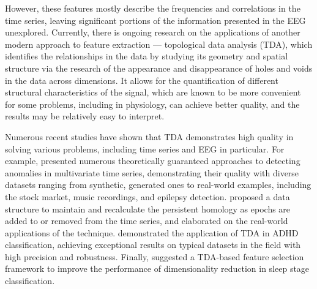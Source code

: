 \documentclass[10pt]{iopart}
\begin{document}
However, these features mostly describe the frequencies and correlations in the time series, leaving significant portions of the information presented in the EEG unexplored. Currently, there is ongoing research on the applications of another modern approach to feature extraction --- topological data analysis (TDA), which identifies the relationships in the data by studying its geometry and spatial structure via the research of the appearance and disappearance of holes and voids in the data across dimensions. It allows for the quantification of different structural characteristics of the signal, which are known to be more convenient for some problems, including in physiology, can achieve better quality, and the results may be relatively easy to interpret.

Numerous recent studies have shown that TDA demonstrates high quality in solving various problems, including time series and EEG in particular. For example, \cite{chazal2024topologicalanalysisdetectinganomalies,rai2024identifyingextremeeventsstock,heo2024persistenthomologyfeaturedtime,chrétien2024timetopologicalanalysiseeg} presented numerous theoretically guaranteed approaches to detecting anomalies in multivariate time series, demonstrating their quality with diverse datasets ranging from synthetic, generated ones to real-world examples, including the stock market, music recordings, and epilepsy detection. \cite{dimontesano2024dynamicallymaintainingpersistenthomology} proposed a data structure to maintain and recalculate the persistent homology as epochs are added to or removed from the time series, and \cite{ost2024bananatreespersistencetime} elaborated on the real-world applications of the technique.  \cite{cai2024topologicalfeaturesearchmethod} demonstrated the application of TDA in ADHD classification, achieving exceptional results on typical datasets in the field with high precision and robustness. Finally, \cite{deng2024twostagehierarchicalexplainablefeature} suggested a TDA-based feature selection framework to improve the performance of dimensionality reduction in sleep stage classification.
\end{document}
